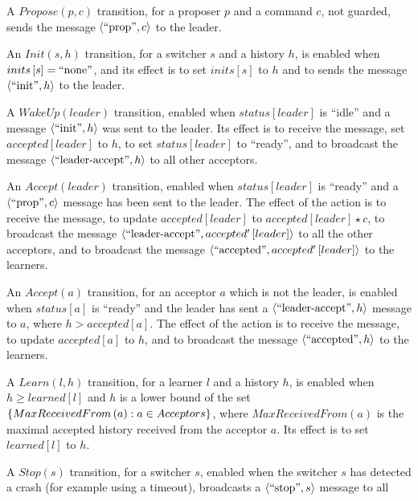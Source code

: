 \documentclass{llncs}
\begin{document}
\begin{compactitem}
\item A $Propose\left( p,c \right)$ transition, for a proposer $p$
  and a command $c$, not guarded, sends the message $\left\langle\text{``prop''},c\right\rangle$ to
  the leader.
\item An $Init\left( s, h \right)$ transition, for a switcher $s$
  and a history $h$, is enabled when $inits\left[ s \right] = \text{``none''}$, and its effect is to set $inits\left[ s \right]$ to $h$ and
  to sends the message $\left\langle\text{``init''},h\right\rangle$ to the leader.
\item A $WakeUp\left( leader \right)$ transition, enabled when
  $status\left[ leader \right]$ is ``idle'' and 
  a message $\left\langle\text{``init''},h\right\rangle$ was sent to the leader. Its effect is to
  receive the message, set $accepted\left[ leader \right]$ to $h$,
  to set $status\left[ leader \right]$ to ``ready'', and to
  broadcast the message $\left\langle\text{``leader-accept''},h\right\rangle$ to all
  other acceptors.
\item An $Accept\left( leader \right)$ transition, enabled when
  $status\left[ leader \right]$ is ``ready'' and a $\left\langle\text{``prop''},c\right\rangle$ message has been sent to the leader. The effect of the
  action is to receive the message, to update $accepted\left[ leader
  \right]$ to $accepted\left[ leader \right]\star c$,  to broadcast the message
  $\left\langle\text{``leader-accept''},accepted'\left[ leader \right]\right\rangle$
  to all the other acceptors, and to
  broadcast the message $\left\langle\text{``accepted''},accepted'\left[ leader
  \right]\right\rangle$ to the learners.
\item An $Accept\left( a \right)$ transition, for an acceptor $a$
  which is not the leader, is enabled when $status\left[ a
  \right]$ is ``ready'' and the leader has sent a
  $\left\langle\text{``leader-accept''},h\right\rangle$ message to $a$, where $h > accepted\left[ a
  \right]$. The effect of the action is to receive the message,
  to update $accepted\left[ a \right]$ to $h$, and to broadcast the
  message $\left\langle\text{``accepted''},h\right\rangle$ to the
  learners.
\item A $Learn\left( l, h \right)$ transition, for a learner $l$
  and a history $h$, is enabled when $h \geq learned\left[ l \right]$ and $h$ is a lower
  bound of the set $\left\{MaxReceivedFrom\left( a \right) : a \in Acceptors\right\}$, where $MaxReceivedFrom\left( a \right)$ is the maximal accepted history received
  from the acceptor $a$.  Its effect is to set $learned\left[ l \right]$ to $h$.
\item A $Stop\left( s \right)$ transition, for a switcher $s$,
  enabled when the switcher $s$ has detected a crash (for example using a timeout), broadcasts a $\left\langle\text{``stop''}, s\right\rangle$ message to all

\end{compactitem}
\end{document}
